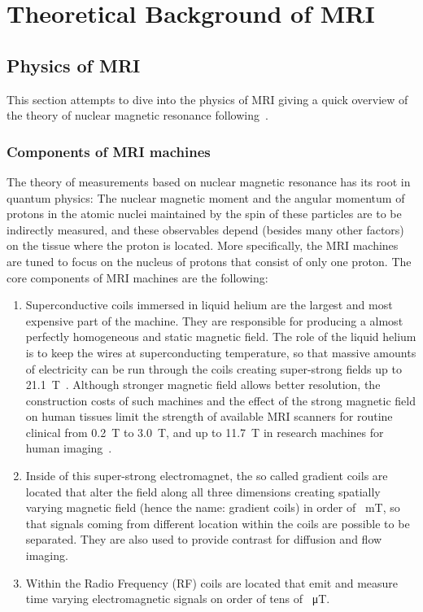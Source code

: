 \chapter{Theoretical Background of MRI}

\section{Physics of MRI}

This section attempts to dive into the physics of MRI giving a quick overview of the theory of nuclear magnetic resonance following~\cite{nishimura_principles_1996, kurzhunov_novel_2017, pooley_fundamental_2005}.

\subsection{Components of MRI machines}
The theory of measurements based on nuclear magnetic resonance has its root in quantum physics: The nuclear magnetic moment and the angular momentum of protons in the atomic nuclei maintained by the spin of these particles are to be indirectly measured, and these observables depend (besides many other factors) on the tissue where the proton is located. More specifically, the MRI
machines are tuned to focus on the nucleus of protons that consist of only one proton. The core components of MRI machines are the following:
\begin{enumerate}
    \item Superconductive coils immersed in liquid helium are the largest and most expensive part of the machine. They are responsible for producing a almost perfectly homogeneous and static magnetic field. The role of the liquid helium is to keep the wires at superconducting temperature, so that massive amounts of electricity can be run through the coils creating super-strong fields up to \SI{21.1}{\tesla}~\cite{schepkin_vivo_2012}. Although stronger magnetic field allows better resolution, the construction costs of such machines and the effect of the strong magnetic field on human tissues limit the strength of available MRI scanners for routine clinical from \SI{0.2}{\tesla} to \SI{3.0}{\tesla}, and up to \SI{11.7}{\tesla} in research machines for human imaging~\cite{ladd_pros_2018}.
    \item Inside of this super-strong electromagnet, the so called gradient coils are located that alter the field along all three dimensions creating spatially varying magnetic field (hence the name: gradient coils) in order of \SI{}{\milli\tesla}, so that signals coming from different location within the coils are possible to be separated. They are also used to provide contrast for diffusion and flow imaging.
    \item Within the Radio Frequency (RF) coils are located that emit and measure time varying electromagnetic signals on order of tens of \SI{}{\micro\tesla}.
\end{enumerate}
